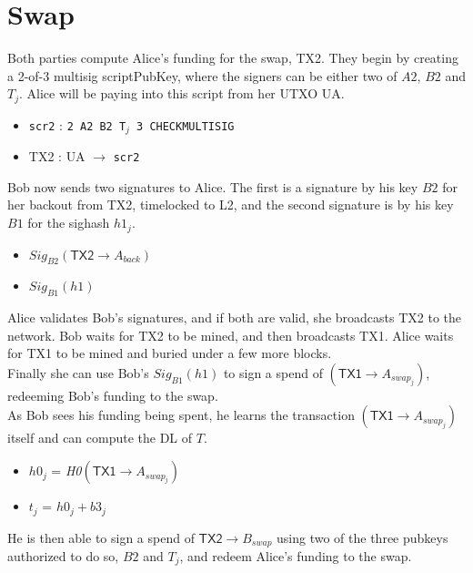 \documentclass[12pt,a4paper]{article}
\begin{document}
\section{Swap}
Both parties compute Alice's funding for the swap, TX2.  They begin by creating a 2-of-3 multisig scriptPubKey, where the signers can be either two of $A2$, $B2$ and $T_j$.  Alice will be paying into this script from her UTXO \textsf{UA}.
\begin{footnotesize}
\begin{itemize}
\item \texttt{scr2} : \texttt{2 A2 B2 T$_j$ 3 CHECKMULTISIG}
\item \textsf{TX2} : \textsf{UA} $\rightarrow$ \texttt{scr2}
\end{itemize}
\end{footnotesize}
Bob now sends two signatures to Alice.  The first is a signature by his key $B2$ for her backout from \textsf{TX2}, timelocked to \textsf{L2}, and the second signature is by his key $B1$ for the sighash $h1_j$.
\begin{footnotesize}
\begin{itemize}
\item $Sig_{B2}(\textsf{TX2} \rightarrow A_{back})$
\item $Sig_{B1}(h1)$
\end{itemize}
\end{footnotesize}
Alice validates Bob's signatures, and if both are valid, she broadcasts \textsf{TX2} to the network.  Bob waits for \textsf{TX2} to be mined, and then broadcasts \textsf{TX1}.  Alice waits for \textsf{TX1} to be mined and buried under a few more blocks.  \\
Finally she can use Bob's $Sig_{B1}(h1)$ to sign a spend of $(\textsf{TX1} \rightarrow A_{swap_j})$, redeeming Bob's funding to the swap.  \\
As Bob sees his funding being spent, he learns the transaction $(\textsf{TX1} \rightarrow A_{swap_j})$ itself and can compute the DL of $T$.
\begin{footnotesize}
\begin{itemize}
\item $h0_j$ = \emph{H0}$(\textsf{TX1} \rightarrow A_{swap_j})$
\item $t_j$ = $h0_j + b3_j$
\end{itemize}
\end{footnotesize}
He is  then able to sign a spend of $\textsf{TX2} \rightarrow B_{swap}$ using two of the three pubkeys authorized to do so, $B2$ and $T_j$, and redeem Alice's funding to the swap.
\newpage
\end{document}
